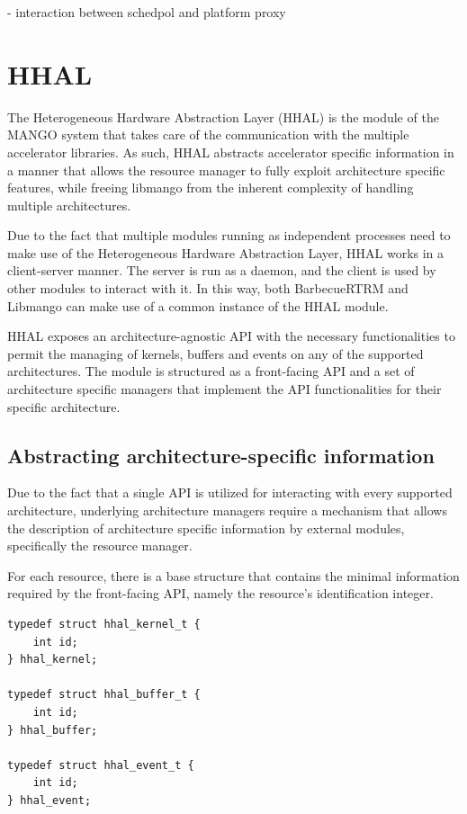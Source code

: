 - interaction between schedpol and platform proxy




\section{HHAL}


The Heterogeneous Hardware Abstraction Layer (HHAL) is the module of the MANGO system that takes care of the communication with the multiple accelerator libraries.
As such, HHAL abstracts accelerator specific information in a manner that allows the resource manager to fully exploit architecture specific features, while freeing libmango from the inherent complexity of handling multiple architectures.

Due to the fact that multiple modules running as independent processes need to make use of the Heterogeneous Hardware Abstraction Layer, HHAL works in a client-server manner. The server is run as a daemon, and the client is used by other modules to interact with it. In this way, both BarbecueRTRM and Libmango can make use of a common instance of the HHAL module.

HHAL exposes an architecture-agnostic API with the necessary functionalities to permit the managing of kernels, buffers and events on any of the supported architectures. The module is structured as a front-facing API and a set of architecture specific managers that implement the API functionalities for their specific architecture.

\subsection{Abstracting architecture-specific information}

Due to the fact that a single API is utilized for interacting with every supported architecture, underlying architecture managers require a mechanism that allows the description of architecture specific information by external modules, specifically the resource manager.

For each resource, there is a base structure that contains the minimal information required by the front-facing API, namely the resource's identification integer. 

\begin{lstlisting}[style=CStyle, caption=HHAL API - Base structures]
typedef struct hhal_kernel_t {
    int id;
} hhal_kernel;

typedef struct hhal_buffer_t {
    int id;
} hhal_buffer;

typedef struct hhal_event_t {
    int id;
} hhal_event;
\end{lstlisting}

